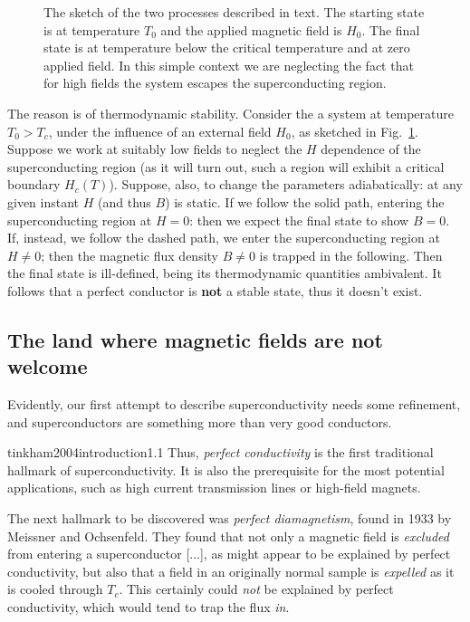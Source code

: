 \begin{figure}
    \centering
    
    \caption{The sketch of the two processes described in text. The starting state is at temperature $T_0$ and the applied magnetic field is $H_0$. The final state is at temperature below the critical temperature and at zero applied field. In this simple context we are neglecting the fact that for high fields the system escapes the superconducting region.}
    \label{fig:perfect conductors and thermodynamics}
\end{figure}

The reason is of thermodynamic stability. Consider the a system at temperature $T_0 > T_c$, under the influence of an external field $H_0$, as sketched in Fig.~\ref{fig:perfect conductors and thermodynamics}. Suppose we work at suitably low fields to neglect the $H$ dependence of the superconducting region (as it will turn out, such a region will exhibit a critical boundary $H_c(T)$). Suppose, also, to change the parameters adiabatically: at any given instant $H$ (and thus $B$) is static. If we follow the solid path, entering the superconducting region at $H=0$: then we expect the final state to show $B=0$. If, instead, we follow the dashed path, we enter the superconducting region at $H\neq 0$; then the magnetic flux density $B\neq 0$ is trapped in the following. Then the final state is ill-defined, being its thermodynamic quantities ambivalent. It follows that a perfect conductor is \textbf{not} a stable state, thus it doesn't exist.

\subsection{The land where magnetic fields are not welcome}\label{subsec:the land where magnetic fields are not welcome}

Evidently, our first attempt to describe superconductivity needs some refinement, and superconductors are something more than very good conductors.

\begin{cit}{tinkham2004introduction}{1.1}
    Thus, \textit{perfect conductivity} is the first traditional hallmark of superconductivity. It is also the prerequisite for the most potential applications, such as high current transmission lines or high-field magnets.

    The next hallmark to be discovered was \textit{perfect diamagnetism}, found in 1933 by Meissner and Ochsenfeld. They found that not only a magnetic field is \textit{excluded} from entering a superconductor [...], as might appear to be explained by perfect conductivity, but also that a field in an originally normal sample is \textit{expelled} as it is cooled through $T_c$. This certainly could \textit{not} be explained by perfect conductivity, which would tend to trap the flux \textit{in}.
\end{cit}

